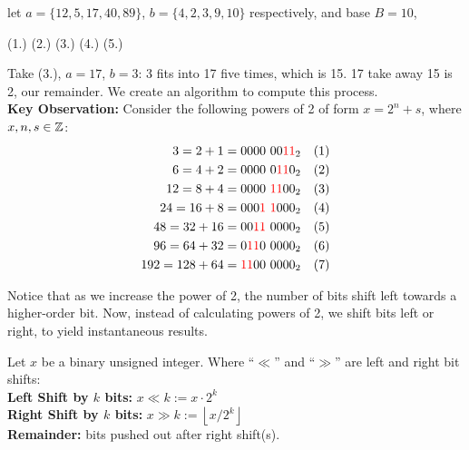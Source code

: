 \begin{Example}
let $a=\{12,5,17,40,89\}$, $b=\{4,2,3,9,10\}$ respectively, and base $B=10$,
\begin{center}
    (1.) (2.) (3.) (4.) (5.) 
\end{center}
\noindent
Take (3.), $a=17$, $b=3$: 3 fits into 17 five times, which is 15. 17 take away 15 is 2, our remainder. We 
create an algorithm to compute this process.\\

\noindent
\textbf{Key Observation:} Consider the following powers of 2 of form $x=2^n+s$, where $x,n,s\in\mathbb{Z}$:
\begin{align*}
    3 = 2 + 1 &= 0000 \ 00\textcolor{red}{11}_2 \quad (1) \\
    6 = 4 + 2 &= 0000 \ 0\textcolor{red}{11}0_2 \quad (2) \\
    12 = 8 + 4 &= 0000 \ \textcolor{red}{11}00_2 \quad (3) \\
    24 = 16 + 8 &= 000\textcolor{red}{1} \ \textcolor{red}{1}000_2 \quad (4) \\
    48 = 32 + 16 &= 00\textcolor{red}{11} \ 0000_2 \quad (5) \\
    96 = 64 + 32 &= 0\textcolor{red}{11}0 \ 0000_2 \quad (6) \\
    192 = 128 + 64 &= \textcolor{red}{11}00 \ 0000_2 \quad (7)
\end{align*}

\noindent
Notice that as we increase the power of 2, the number of bits shift left towards a higher-order bit. Now, instead of calculating powers of 
2, we shift bits left or right, to yield instantaneous results.
\end{Example}

\begin{theo}

    \label{theo:bit_shift}

    Let $x$ be a binary unsigned integer. Where ``$\ll$'' and ``$\gg$'' are left and right bit shifts:\\
    \noindent
    \textbf{Left Shift by $k$ bits:} $x \ll k := x \cdot 2^k$\\
    \noindent
    \textbf{Right Shift by $k$ bits:} $x \gg k := \left\lfloor x/2^k \right\rfloor$\\
    \textbf{Remainder:} bits pushed out after right shift(s).
\end{theo}

